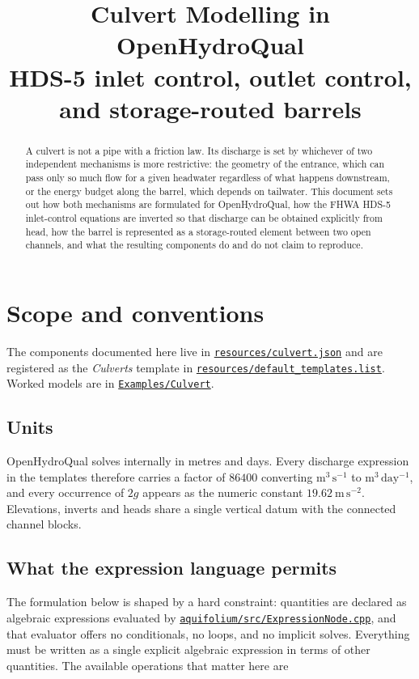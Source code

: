 \documentclass[11pt,a4paper]{article}
\title{\textbf{Culvert Modelling in OpenHydroQual}\\[0.3em]
       \large HDS-5 inlet control, outlet control, and storage-routed barrels}
\author{}
\date{}
\newcommand{\file}[1]{\texttt{\small #1}}
\newcommand{\ghbase}{https://github.com/ArashMassoudieh/OpenHydroQual/blob/master}
\newcommand{\ghtree}{https://github.com/ArashMassoudieh/OpenHydroQual/tree/master}
\newcommand{\exfile}[1]{\href{\ghbase/#1}{\file{#1}}}
\newcommand{\exdir}[1]{\href{\ghtree/#1}{\file{#1}}}
\begin{document}
\maketitle
\vspace{-2.5em}

\begin{abstract}
\noindent
A culvert is not a pipe with a friction law. Its discharge is set by whichever
of two independent mechanisms is more restrictive: the geometry of the entrance,
which can pass only so much flow for a given headwater regardless of what
happens downstream, or the energy budget along the barrel, which depends on
tailwater. This document sets out how both mechanisms are formulated for
OpenHydroQual, how the FHWA HDS-5 inlet-control equations are inverted so that
discharge can be obtained explicitly from head, how the barrel is represented
as a storage-routed element between two open channels, and what the resulting
components do and do not claim to reproduce.
\end{abstract}

\tableofcontents

\section{Scope and conventions}

The components documented here live in \exfile{resources/culvert.json} and are
registered as the \emph{Culverts} template in
\exfile{resources/default\_templates.list}. Worked models are in
\exdir{Examples/Culvert}.

\subsection{Units}

OpenHydroQual solves internally in metres and days. Every discharge expression
in the templates therefore carries a factor of $86400$ converting
$\mathrm{m^3\,s^{-1}}$ to $\mathrm{m^3\,day^{-1}}$, and every occurrence of
$2g$ appears as the numeric constant $19.62\ \mathrm{m\,s^{-2}}$. Elevations,
inverts and heads share a single vertical datum with the connected channel
blocks.

\subsection{What the expression language permits}\label{sec:lang}

The formulation below is shaped by a hard constraint: quantities are declared as
algebraic expressions evaluated by \exfile{aquifolium/src/ExpressionNode.cpp},
and that evaluator offers no conditionals, no loops, and no implicit solves.
Everything must be written as a single explicit algebraic expression in terms of
other quantities. The available operations that matter here are
\end{document}
